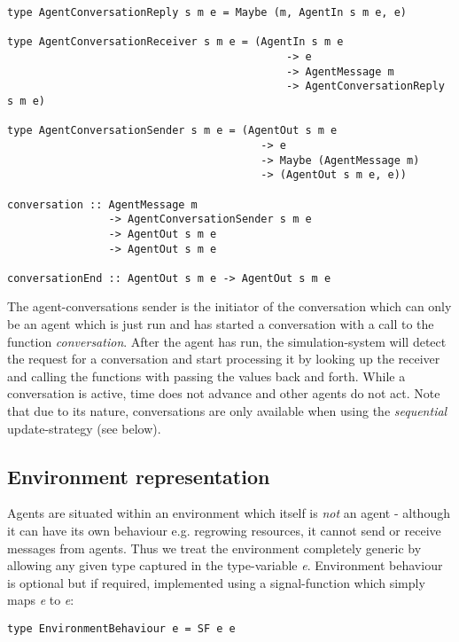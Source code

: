 \begin{verbatim}
type AgentConversationReply s m e = Maybe (m, AgentIn s m e, e)

type AgentConversationReceiver s m e = (AgentIn s m e
                                            -> e
                                            -> AgentMessage m
                                            -> AgentConversationReply s m e)

type AgentConversationSender s m e = (AgentOut s m e
                                        -> e
                                        -> Maybe (AgentMessage m)  
                                        -> (AgentOut s m e, e))
                                        
conversation :: AgentMessage m
                -> AgentConversationSender s m e
                -> AgentOut s m e
                -> AgentOut s m e

conversationEnd :: AgentOut s m e -> AgentOut s m e
\end{verbatim}

The agent-conversations sender is the initiator of the conversation which can only be an agent which is just run and has started a conversation with a call to the function \textit{conversation}. After the agent has run, the simulation-system will detect the request for a conversation and start processing it by looking up the receiver and calling the functions with passing the values back and forth. While a conversation is active, time does not advance and other agents do not act. Note that due to its nature, conversations are only available when using the \textit{sequential} update-strategy (see below).

\subsection{Environment representation}
Agents are situated within an environment which itself is \textit{not} an agent - although it can have its own behaviour e.g. regrowing resources, it cannot send or receive messages from agents. Thus we treat the environment completely generic by allowing any given type captured in the type-variable \textit{e}. Environment behaviour is optional but if required, implemented using a signal-function which simply maps \textit{e} to \textit{e}:

\begin{verbatim}
type EnvironmentBehaviour e = SF e e
\end{verbatim}

